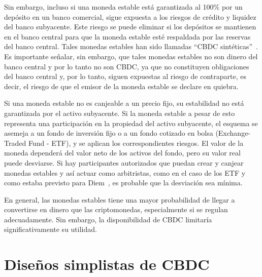 \documentclass[10pt,spanish]{article}
\begin{document}
Sin embargo, incluso si una moneda estable está garantizada al 100\% por
un depósito en un banco comercial, sigue expuesta a los riesgos de
crédito y liquidez del banco subyacente. Este riesgo se puede eliminar
si los depósitos se mantienen en el banco central para que la moneda
estable esté respaldada por las reservas del banco central. Tales
monedas estables han sido llamadas ``CBDC sintéticas''~\cite{Adrian}.
Es importante señalar, sin embargo, que tales
monedas estables no son dinero del banco central y por lo tanto no son
CBDC, ya que no constituyen obligaciones del banco central y, por lo
tanto, siguen expuestas al riesgo de contraparte, es decir, el riesgo de
que el emisor de la moneda estable se declare en quiebra.

Si una moneda estable no es canjeable a un precio fijo, su estabilidad
no está garantizada por el activo subyacente. Si la moneda estable a
pesar de esto representa una participación en la propiedad del activo
subyacente, el esquema se asemeja a un fondo de inversión fijo o a un
fondo cotizado en bolsa (Exchange-Traded Fund - ETF), y se aplican los
correspondientes riesgos. El valor de la moneda dependerá del valor neto
de los activos del fondo, pero su valor real puede desviarse. Si hay
participantes autorizados que puedan crear y canjear monedas estables y
así actuar como arbitristas, como en el caso de los ETF y como estaba
previsto para Diem~\cite{Libra}, es probable que la
desviación sea mínima.

En general, las monedas estables tiene una mayor probabilidad de llegar
a convertirse en dinero que las criptomonedas, especialmente si se
regulan adecuadamente. Sin embargo, la disponibilidad de CBDC limitaría
significativamente su utilidad.

\hypertarget{diseuxf1os-simplistas-de-cbdc}{%
\section{Diseños simplistas de CBDC} \label{3.-diseuxf1os-simplistas-de-cbdc}}
\end{document}
